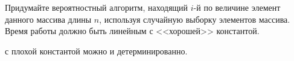 Придумайте вероятностный алгоритм, находящий $i$-й по величине элемент данного массива длины $n$,
используя случайную выборку элементов массива. Время работы должно быть линейным с <<хорошей>>
константой.

 с плохой константой можно и детерминированно.

